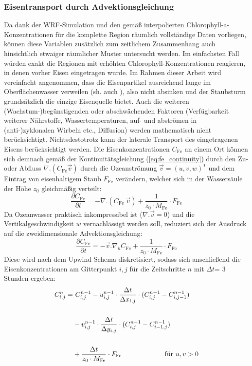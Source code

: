 \documentclass[12pt,a4paper,onecolumn]{scrartcl}
\begin{document}
\subsubsection{Eisentransport durch Advektionsgleichung} \label{sec:methods_advection}
Da dank der WRF-Simulation und den gemäß \citet{Saulquin.2019} interpolierten Chlorophyll-a-Konzentrationen für die komplette Region räumlich vollständige Daten vorliegen, können diese Variablen zusätzlich zum zeitlichem Zusammenhang auch hinsichtlich etwaiger räumlicher Muster untersucht werden. Im einfachsten Fall würden exakt die Regionen mit erhöhten Chlorophyll-Konzentrationen reagieren, in denen vorher Eisen eingetragen wurde. Im Rahmen dieser Arbeit wird vereinfacht angenommen, dass die Eisenpartikel ausreichend lange im Oberflächenwasser verweilen (sh. auch \citet{Cropp.2013}), also nicht absinken und der Staubsturm grundsätzlich die einzige Eisenquelle bietet. Auch die weiteren (Wachstum-)begünstigenden oder abschwächenden Faktoren (Verfügbarkeit weiterer Nährstoffe, Wassertemperaturen, auf- und abströmen in (anti-)zyklonalen Wirbeln etc., Diffusion) werden mathematisch nicht berücksichtigt. Nichtsdestotrotz kann der laterale Transport des eingetragenen Eisens berücksichtigt werden. Die Eisenkonzentrationen $C_\text{Fe}$ an einem Ort können sich demnach gemäß der Kontinuitätsgleichung (\ref{eq:fe_continuity}) durch den Zu- oder Abfluss $\nabla . (C_\text{Fe} \vec{v})$ durch die Ozeanströmung $\vec{v} = (u,v,w)^T$  und dem Eintrag von eisenhaltigem Staub $F_\text{Fe}$ verändern, welcher sich in der Wassersäule der Höhe $z_0$ gleichmäßig verteilt:
\begin{equation}
\frac{\partial C_\text{Fe}}{\partial t} = - \nabla . (C_\text{Fe} \ \vec{v}) + \frac{1}{z_0 \cdot M_\text{Fe}} \cdot F_\text{Fe} \label{eq:fe_continuity}
\end{equation}
Da Ozeanwasser praktisch inkompressibel ist ($\nabla . \vec{v}=0$) und die Vertikalgeschwindigkeit $w$ vernachlässigt werden soll, reduziert sich der Ausdruck auf die zweidimensionale Advektionsgleichung:
\begin{equation}
\frac{\partial C_\text{Fe}}{\partial t} = - \vec{v} . \nabla_h  C_\text{Fe}  + \frac{1}{z_0 \cdot M_\text{Fe}} \cdot F_\text{Fe}
\end{equation}
Diese wird nach dem Upwind-Schema diskretisiert, sodass sich anschließend die Eisenkonzentrationen am Gitterpunkt $i,j$ für die Zeitschritte $n$ mit $\Delta t$= 3 Stunden ergeben:
\begin{equation}
\begin{split}
C_{i,j}^n = &\ C_{i,j}^{n-1} - u_{i,j}^{n-1} \cdot \frac{\Delta t}{\Delta x_{i,j}} \cdot (C_{i,j}^{n-1} - C_{i,j-1}^{n-1}) \\\\
&- v_{i,j}^{n-1} \cdot \frac{\Delta t}{\Delta y_{i,j}} \cdot (C_{i,j}^{n-1} - C_{i-1,j}^{n-1})  \\\\
&+ \frac{\Delta t}{z_0 \cdot M_\text{Fe}} \cdot F_\text{Fe} \text{ \qquad  \qquad \qquad für } u,v > 0 \\\\
\end{split}
\end{equation}
\end{document}
